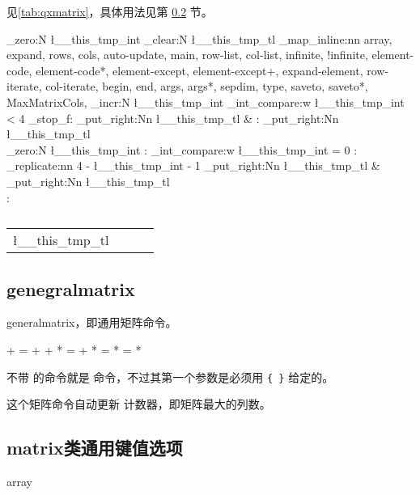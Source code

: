 \documentclass{ctxdoc}
\def\paremph#1{\par\bigskip\noindent{\bfseries\large #1}\endgraf\medskip}
\newcommand\dispkeyval[2][5]{
  \int_zero:N \l__this_tmp_int
  \tl_clear:N \l__this_tmp_tl
  \clist_map_inline:nn {#2}
    {
        \int_incr:N \l__this_tmp_int 
        \if_int_compare:w \l__this_tmp_int < #1 \exp_stop_f:
            \tl_put_right:Nn \l__this_tmp_tl { \opt{##1} & }
        \else:
            \tl_put_right:Nn \l__this_tmp_tl { \opt{##1} \\ \hline }
            \int_zero:N \l__this_tmp_int
        \fi:
    }
    \if_int_compare:w \l__this_tmp_int = 0
    \else:
        \prg_replicate:nn { #1 - \l__this_tmp_int - 1 }
            { \tl_put_right:Nn \l__this_tmp_tl { & } }
        \tl_put_right:Nn \l__this_tmp_tl { \\ \hline }
    \fi:
    \begin{tabularx}{\textwidth}{|*{#1}{X|}}
        \hline
        \l__this_tmp_tl
    \end{tabularx}
}
\begin{document}
\paremph{\cs{qxmatrix} 可用的键值选项：}
见\autoref{tab:qxmatrix}，具体用法见第 \ref{sec:keyvals} 节。

\begin{table}[!htp]
\caption{}\label{tab:qxmatrix}
\dispkeyval[4]{
    array,
    expand,
    rows,
    cols,
    auto-update,
    main,
    row-list,
    col-list,
    infinite,
    !infinite,
    element-code,
    element-code*,
    element-except,
    element-except+,
    expand-element,
    row-iterate,
    col-iterate,
    begin,
    end,
    args,
    args*,
    sepdim,
    type,
    saveto,
    saveto*,
    MaxMatrixCols,
}
\end{table}

\subsection{genegralmatrix}

generalmatrix，即通用矩阵命令。

\begin{function}{\generalmatrix}
    \begin{syntax}
           +   
         = +   
           + * 
         = + * 
                  
         =        
           *      
         = *      
    \end{syntax}

    不带 \opt{+} 的命令就是  命令，不过其第一个参数是必须用 \verb|{ }| 给定的。

    这个矩阵命令自动更新  计数器，即矩阵最大的列数。
\end{function}


\subsection{matrix类通用键值选项}\label{sec:keyvals}

\begin{function}{array}
\end{function}
\end{document}
